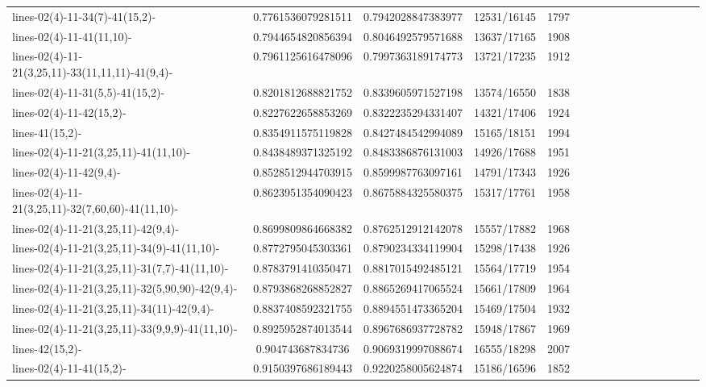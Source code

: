 \documentclass[12pt,oneside]{report}			%
\begin{document}
\begin{landscape}
\begin{longtable}{ | p{5cm} | *{15}{c|}}
lines-02(4)-11-34(7)-41(15,2)-                    & 0.7761536079281511  & 0.7942028847383977  & 12531/16145 & 1797 \\
lines-02(4)-11-41(11,10)-                         & 0.7944654820856394  & 0.8046492579571688  & 13637/17165 & 1908 \\
lines-02(4)-11-21(3,25,11)-33(11,11,11)-41(9,4)-   & 0.7961125616478096  & 0.7997363189174773  & 13721/17235 & 1912 \\
lines-02(4)-11-31(5,5)-41(15,2)-                  & 0.8201812688821752  & 0.8339605971527198  & 13574/16550 & 1838 \\
lines-02(4)-11-42(15,2)-                          & 0.8227622658853269  & 0.8322235294331407  & 14321/17406 & 1924 \\
lines-41(15,2)-                                   & 0.8354911575119828  & 0.8427484542994089  & 15165/18151 & 1994 \\
lines-02(4)-11-21(3,25,11)-41(11,10)-             & 0.8438489371325192  & 0.8483386876131003  & 14926/17688 & 1951 \\
lines-02(4)-11-42(9,4)-                           & 0.8528512944703915  & 0.8599987763097161  & 14791/17343 & 1926 \\
lines-02(4)-11-21(3,25,11)-32(7,60,60)-41(11,10)- & 0.8623951354090423  & 0.8675884325580375  & 15317/17761 & 1958 \\
lines-02(4)-11-21(3,25,11)-42(9,4)-               & 0.8699809864668382  & 0.8762512912142078  & 15557/17882 & 1968 \\
lines-02(4)-11-21(3,25,11)-34(9)-41(11,10)-       & 0.8772795045303361  & 0.8790234334119904  & 15298/17438 & 1926 \\
lines-02(4)-11-21(3,25,11)-31(7,7)-41(11,10)-     & 0.8783791410350471  & 0.8817015492485121  & 15564/17719 & 1954 \\
lines-02(4)-11-21(3,25,11)-32(5,90,90)-42(9,4)-   & 0.8793868268852827  & 0.8865269417065524  & 15661/17809 & 1964 \\
lines-02(4)-11-21(3,25,11)-34(11)-42(9,4)-        & 0.8837408592321755  & 0.8894551473365204  & 15469/17504 & 1932 \\
lines-02(4)-11-21(3,25,11)-33(9,9,9)-41(11,10)-   & 0.8925952874013544  & 0.8967686937728782  & 15948/17867 & 1969 \\
lines-42(15,2)-                                   & 0.904743687834736   & 0.9069319997088674  & 16555/18298 & 2007 \\
lines-02(4)-11-41(15,2)-                          & 0.9150397686189443  & 0.9220258005624874  & 15186/16596 & 1852 \\

\end{longtable}
\end{landscape}
\end{document}
